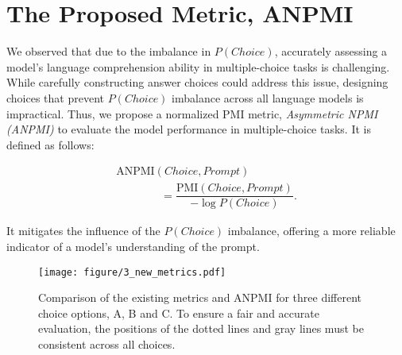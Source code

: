 
\section{The Proposed Metric, ANPMI}
We observed that due to the imbalance in {\small $P(Choice)$}, accurately assessing a model's language comprehension ability in multiple-choice tasks is challenging. While carefully constructing answer choices could address this issue, designing choices that prevent {\small $  P(Choice)$} imbalance across all language models is impractical. Thus, we propose a normalized PMI metric, \textit{Asymmetric NPMI (ANPMI)} to evaluate the model performance in multiple-choice tasks. It is defined as follows:   

\begin{small}
\begin{equation}
\begin{array}{l}
\mbox{ANPMI}(Choice,Prompt) \\[5pt]
\quad \quad \quad \quad = \dfrac{\mbox{PMI}(Choice,Prompt)}{-\log{P(Choice)}}.
\end{array}
\label{eq:anpmi}
\end{equation}
\end{small}
It mitigates the influence of the {\small $P(Choice)$} imbalance, offering a more reliable indicator of a model's understanding of the prompt.

\begin{figure*}[!t]
   \centering
   \texttt{[image: figure/3\_new\_metrics.pdf]}
   \vspace*{-0.5\baselineskip}
   \caption{Comparison of the existing metrics and ANPMI for three different choice options, A, B and C.  
   {To ensure a fair and accurate evaluation, the positions of the dotted lines and gray lines must be consistent across all choices.}} 
\label{fig:metric_comparison}
\end{figure*}

